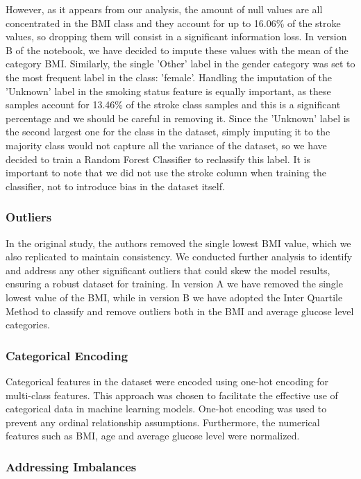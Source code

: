 \documentclass{Configuration_Files/Template}
\begin{document}
However, as it appears from our analysis, the amount of null values are all concentrated in the BMI class and they account for up to 16.06\% of the stroke values, so dropping them will consist in a significant information loss. In version B of the notebook, we have decided to impute these values with the mean of the category BMI.
Similarly, the single 'Other' label in the gender category was set to the most frequent label in the class: 'female'. Handling the imputation of the 'Unknown' label in the smoking status feature is equally important, as these samples account for 13.46\% of the stroke class samples and this is a significant percentage and we should be careful in removing it.
Since the 'Unknown' label is the second largest one for the class in the dataset, simply imputing it to the majority class would not capture all the variance of the dataset, so we have decided to train a Random Forest Classifier to reclassify this label. It is important to note that we did not use the stroke column when training the classifier, not to introduce bias in the dataset itself.

\subsubsection{Outliers}

In the original study, the authors removed the single lowest BMI value, which we also replicated to maintain consistency. We conducted further analysis to identify and address any other significant outliers that could skew the model results, ensuring a robust dataset for training. In version A we have removed the single lowest value of the BMI, while in version B we have adopted the Inter Quartile Method to classify and remove outliers both in the BMI and average glucose level categories.

\subsubsection{Categorical Encoding}

Categorical features in the dataset were encoded using one-hot encoding for multi-class features. This approach was chosen to facilitate the effective use of categorical data in machine learning models. One-hot encoding was used to prevent any ordinal relationship assumptions. Furthermore, the numerical features such as BMI, age and average glucose level were normalized.

\subsubsection{Addressing Imbalances}
\end{document}
